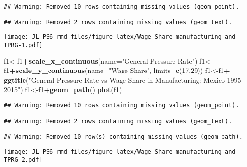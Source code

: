\documentclass[
]{article}
\newenvironment{Shaded}{\begin{snugshade}}{\end{snugshade}}
\newcommand{\DataTypeTok}[1]{\textcolor[rgb]{0.13,0.29,0.53}{#1}}
\newcommand{\DecValTok}[1]{\textcolor[rgb]{0.00,0.00,0.81}{#1}}
\newcommand{\KeywordTok}[1]{\textcolor[rgb]{0.13,0.29,0.53}{\textbf{#1}}}
\newcommand{\NormalTok}[1]{#1}
\newcommand{\OperatorTok}[1]{\textcolor[rgb]{0.81,0.36,0.00}{\textbf{#1}}}
\newcommand{\StringTok}[1]{\textcolor[rgb]{0.31,0.60,0.02}{#1}}
\begin{document}
\begin{verbatim}
## Warning: Removed 10 rows containing missing values (geom_point).
\end{verbatim}

\begin{verbatim}
## Warning: Removed 2 rows containing missing values (geom_text).
\end{verbatim}

\texttt{[image: JL\_PS6\_rmd\_files/figure-latex/Wage Share manufacturing and TPRG-1.pdf]}

\begin{Shaded}
\begin{Highlighting}[]
\NormalTok{f1<-f1}\OperatorTok{+}\KeywordTok{scale_x_continuous}\NormalTok{(}\DataTypeTok{name=}\StringTok{"General Pressure Rate"}\NormalTok{)}
\NormalTok{f1<-f1}\OperatorTok{+}\KeywordTok{scale_y_continuous}\NormalTok{(}\DataTypeTok{name=}\StringTok{"Wage Share"}\NormalTok{, }\DataTypeTok{limits=}\KeywordTok{c}\NormalTok{(}\DecValTok{17}\NormalTok{,}\DecValTok{29}\NormalTok{))}
\NormalTok{f1<-f1}\OperatorTok{+}\StringTok{ }\KeywordTok{ggtitle}\NormalTok{(}\StringTok{"General Pressure Rate vs Wage Share in Manufacturing: Mexico 1995-2015"}\NormalTok{)}
\NormalTok{f1<-f1}\OperatorTok{+}\KeywordTok{geom_path}\NormalTok{()}
\KeywordTok{plot}\NormalTok{(f1)}
\end{Highlighting}
\end{Shaded}

\begin{verbatim}
## Warning: Removed 10 rows containing missing values (geom_point).

## Warning: Removed 2 rows containing missing values (geom_text).
\end{verbatim}

\begin{verbatim}
## Warning: Removed 10 row(s) containing missing values (geom_path).
\end{verbatim}

\texttt{[image: JL\_PS6\_rmd\_files/figure-latex/Wage Share manufacturing and TPRG-2.pdf]}
\end{document}
